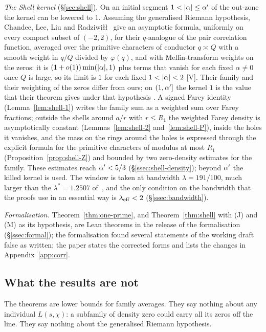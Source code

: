 \emph{The Shell kernel} (\S\ref{sec:shell}). On an initial segment $1<\lvert \alpha\rvert\le\alpha'$ of the out-zone the kernel can be lowered to $1$. Assuming
the generalised Riemann hypothesis, Chandee, Lee, Liu and Radziwi\l\l~\cite[Theorem~2]{CLLR14} give an asymptotic formula, uniformly on every
compact subset of $(-2,2)$, for their $q$-analogue of the pair correlation function, averaged over the primitive characters of conductor $q\asymp Q$
with a smooth weight in $q/Q$ divided by $\varphi(q)$, and with Mellin-transform weights on the zeros: it is
$(1+o(1))\min(\lvert \alpha\rvert,1)$ plus terms that vanish for each fixed $\alpha\ne0$ once $Q$ is large, so its limit is $1$ for each fixed $1<\lvert \alpha\rvert<2$ [V].
Their family and their weighting of the zeros differ from ours; on $(1,\alpha']$ the kernel $1$ is the value that their theorem gives under that
hypothesis \tagM. A signed Farey identity (Lemma~\ref{lem:shell-1}) writes the family sum as a weighted sum over Farey fractions; outside
the shells around $a/r$ with $r\le R_1$ the weighted Farey density is asymptotically constant (Lemmas~\ref{lem:shell-2} and~\ref{lem:shell-P}),
inside the holes it vanishes, and the mass on the rings around the holes is expressed through the explicit formula for the primitive characters of
modulus at most $R_1$ (Proposition~\ref{prop:shell-Z}) and bounded by two zero-density estimates for the family. These estimates reach
$\alpha'<5/3$ (\S\ref{ssec:shell-density}); beyond $\alpha'$ the killed kernel is used. The window is taken at bandwidth $\lambda=191/100$, much
larger than the $\lambda^*=1.2507$ of~\cite{DSouza}, and the only condition on the bandwidth that the proofs use in an essential way is
$\lambda_{\rm eff}<2$ (\S\ref{ssec:bandwidth}).

\emph{Formalisation.} Theorem~\ref{thm:one-prime}, and Theorem~\ref{thm:shell} with (J) and (M) as its hypothesis, are Lean theorems in the
release of the formalisation (\S\ref{ssec:formal}); the formalisation found several statements of the
working draft false as written; the paper states the corrected forms and lists the changes in Appendix~\ref{app:corr}.

\subsection{What the results are not}\label{ssec:not}
The theorems are lower bounds for family averages. They say nothing about any individual $L(s,\chi)$: a subfamily of density zero could carry all
its zeros off the line. They say nothing about the generalised Riemann hypothesis.

